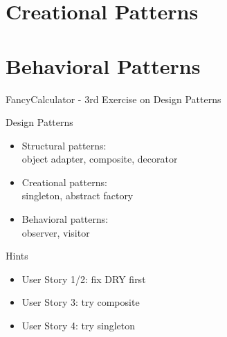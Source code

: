 \section{Creational Patterns}


\section{Behavioral Patterns}


\begin{frame}
	\begin{fancycolumns}[widths={65}]
		\begin{example}{FancyCalculator - 3rd Exercise on Design Patterns}
			\begin{itemize}
				\userstoriesA
				\userstoriesB
				\userstoriesC
			\end{itemize}
		\end{example}
	\nextcolumn
		\begin{definition}{Design Patterns}
			\begin{itemize}
				\item Structural patterns:\\object adapter, composite, decorator
				\item Creational patterns:\\singleton, abstract factory
				\item Behavioral patterns:\\observer, visitor
			\end{itemize}
		\end{definition}
		\begin{note}{Hints}
			\begin{itemize}
				\item User Story 1/2: fix DRY first
				\item User Story 3: try composite
				\item User Story 4: try singleton
			\end{itemize}
		\end{note}
	\end{fancycolumns}
\end{frame}

